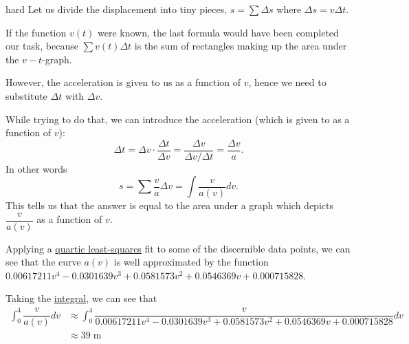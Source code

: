 \begin{solution}{hard}
Let us divide the displacement into tiny pieces, $s=\sum\Delta s$ where $\Delta s = v\Delta t$. \vspace{3mm} 

If the function $v(t)$ were known, the last formula would have been completed our task, because $\sum v(t)\Delta t$ is the sum of rectangles making up the area under the $v-t$-graph. \vspace{3mm}

However, the acceleration is given to us as a function of $v$, hence we need to substitute $\Delta t$ with $\Delta v$. \vspace{3mm}

While trying to do that, we can introduce the acceleration (which is given to as a function of $v$):
\[\Delta t = \Delta v\cdot \frac{\Delta t}{\Delta v} = \frac{\Delta v}{\Delta v/\Delta t} = \frac{\Delta v}{a}.\]
In other words
\[s = \sum \frac{v}{a}\Delta v = \int \frac{v}{a(v)}dv.\]This tells us that the answer is equal to the area under a graph which depicts $\dfrac{v}{a(v)}$ as a function of $v$.\vspace{3mm}

Applying a \href{https://www.wolframalpha.com/input/?i=fit+\%7B0\%2C0\%7D\%2C\%7B2\%2C0.2\%7D\%2C\%7B3.1\%2C0.4\%7D\%2C\%7B4\%2C0.8\%7D\%2C\%7B3.3\%2C0.46\%7D\%2C\%7B2.3\%2C0.24\%7D\%2C\%7B2.4\%2C0.26\%7D\%2C\%7B0.7\%2C0.06\%7D\%2C\%7B1.7\%2C0.16\%7D\%2C\%7B0.5\%2C0.04\%7D}{quartic least-squares} fit to some of the discernible data points, we can see that the curve $a(v)$ is well approximated by the function $0.00617211 v^4 - 0.0301639 v^3 + 0.0581573 v^2 + 0.0546369 v + 0.000715828$.\vspace{3mm}

Taking the \href{https://www.wolframalpha.com/input/?i=integral+from+0+to+4+of+x\%2F\%280.00617211+x\%5E4+-+0.0301639+x\%5E3+\%2B+0.0581573+x\%5E2+\%2B+0.0546369+x+\%2B+0.000715828\%29}{integral}, we can see that
\begin{align*}
    \int_0^4\dfrac{v}{a(v)}dv&\approx\int_0^4\dfrac{v}{0.00617211 v^4 - 0.0301639 v^3 + 0.0581573 v^2 + 0.0546369 v + 0.000715828}dv\\
    &\approx \boxed{39\;\text{m}}
\end{align*}
\end{solution}